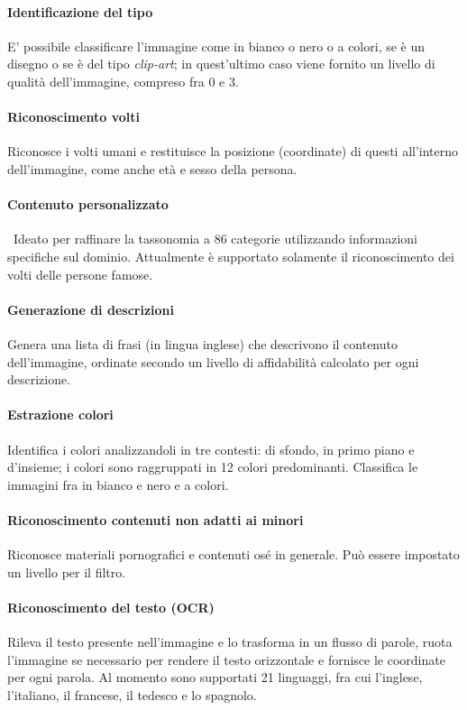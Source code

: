 \documentclass[fleqn,a4paper,11pt]{report}
\begin{document}
\paragraph{Identificazione del tipo} E' possibile classificare l'immagine come in bianco o nero o a colori, se è un disegno o se è del tipo \textit{clip-art}; in quest'ultimo caso viene fornito un livello di qualità dell'immagine, compreso fra 0 e 3.

\paragraph{Riconoscimento volti} Riconosce i volti umani e restituisce la posizione (coordinate) di questi all'interno dell'immagine, come anche età e sesso della persona.

\paragraph{Contenuto personalizzato} Ideato per raffinare la tassonomia a 86 categorie utilizzando informazioni specifiche sul dominio. Attualmente è supportato solamente il riconoscimento dei volti delle persone famose.

\paragraph{Generazione di descrizioni} Genera una lista di frasi (in lingua inglese) che descrivono il contenuto dell'immagine, ordinate secondo un livello di affidabilità calcolato per ogni descrizione.

\paragraph{Estrazione colori} Identifica i colori analizzandoli in tre contesti: di sfondo, in primo piano e d'insieme; i colori sono raggruppati in 12 colori predominanti. Classifica le immagini fra in bianco e nero e a colori.

\paragraph{Riconoscimento contenuti non adatti ai minori} Riconosce materiali pornografici e contenuti osé in generale. Può essere impostato un livello per il filtro.

\paragraph{Riconoscimento del testo (OCR)} Rileva il testo presente nell'immagine e lo trasforma in un flusso di parole, ruota l'immagine se necessario per rendere il testo orizzontale e fornisce le coordinate per ogni parola. Al momento sono supportati 21 linguaggi, fra cui l'inglese, l'italiano, il francese, il tedesco e lo spagnolo.
\end{document}
